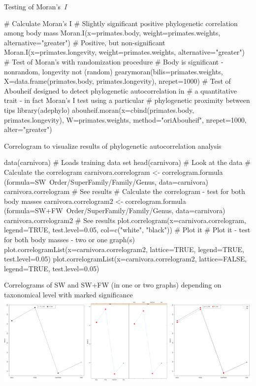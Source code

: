 \documentclass[compress, ucs, xelatex, 11pt, xcolor=svgnames,
  hyperref={
    bookmarks=true,
    unicode=true,
    colorlinks=true,
    pdftitle={Molecular data in R},
    plainpages=false,
    pdfauthor={Vojtech Zeisek},
    pdfsubject={Course about phylogeny and evolution in R},
    pdfcreator={XeLaTeX},
    pdfkeywords={R, evolution, phylogeny, molecular data},
    linkcolor=Tomato,
    anchorcolor=SaddleBrown,
    citecolor=Goldenrod,
    filecolor=DarkMagenta,
    menucolor=Sienna,
    urlcolor=DarkTurquoise,
    pdftex},
  url={hyphens, lowtilde} %
  ]{beamer}
\begin{document}
\begin{frame}[fragile]{Testing of Moran's~\textit{I}}
  \begin{spluscode}
    # Calculate Moran's I
    # Slightly significant positive phylogenetic correlation among body mass
    Moran.I(x=primates.body, weight=primates.weights,
      alternative="greater")
    # Positive, but non-significant
    Moran.I(x=primates.longevity, weight=primates.weights,
      alternative="greater")
    # Test of Moran's with randomization procedure
    # Body is significant - nonrandom, longevity not (random)
    gearymoran(bilis=primates.weights, X=data.frame(primates.body,
      primates.longevity), nrepet=1000)
    # Test of Abouheif designed to detect phylogenetic autocorrelation in
    # a quantitative trait - in fact Moran's I test using a particular
    # phylogenetic proximity between tips
    library(adephylo)
    abouheif.moran(x=cbind(primates.body, primates.longevity),
      W=primates.weights, method="oriAbouheif", nrepet=1000,
      alter="greater")
  \end{spluscode}
\end{frame}

\begin{frame}[fragile]{Correlogram to visualize results of phylogenetic autocorrelation analysis}
  \begin{spluscode}
    data(carnivora) # Loads training data set
    head(carnivora) # Look at the data
    # Calculate the correlogram
    carnivora.correlogram <- correlogram.formula
      (formula=SW~Order/SuperFamily/Family/Genus, data=carnivora)
    carnivora.correlogram # See results
    # Calculate the correlogram - test for both body masses
    carnivora.correlogram2 <- correlogram.formula
      (formula=SW+FW~Order/SuperFamily/Family/Genus, data=carnivora)
    carnivora.correlogram2 # See results
    plot.correlogram(x=carnivora.correlogram, legend=TRUE,
      test.level=0.05, col=c("white", "black")) # Plot it
    # Plot it - test for both body masses - two or one graph(s)
    plot.correlogramList(x=carnivora.correlogram2, lattice=TRUE,
      legend=TRUE, test.level=0.05)
    plot.correlogramList(x=carnivora.correlogram2, lattice=FALSE,
      legend=TRUE, test.level=0.05)
  \end{spluscode}
\end{frame}

\begin{frame}{Correlograms of SW and SW+FW (in one or two graphs) depending on taxonomical level with marked significance}
  \includegraphics[width=\textwidth]{correlog.png}
\end{frame}
\end{document}
